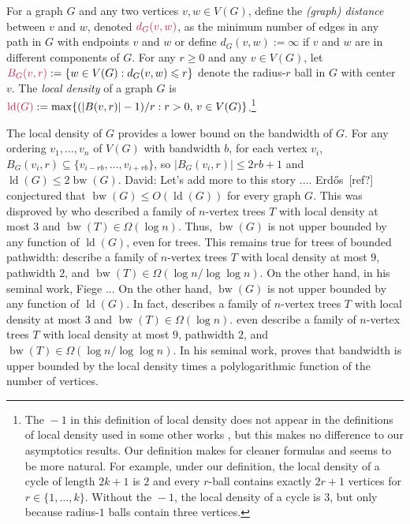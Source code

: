 \documentclass{patmorin}
\makeatletter
\renewcommand{\ge}{\geqslant}
\renewcommand{\le}{\leqslant}
\renewcommand{\leq}{\leqslant}
\newcommand{\david}[1]{{\color{orange} David: #1}}
\newcommand{\defin}[1]{\emph{\textcolor{brightmaroon}{#1}}}
\def\mathcolor#1#{\@mathcolor{#1}}
\def\@mathcolor#1#2#3{%
  \protect\leavevmode
  \begingroup
    \color#1{#2}#3%
  \endgroup
}
\newcommand{\mathdefin}[1]{\mathcolor{brightmaroon}{#1}}
\DeclareMathOperator{\bw}{bw}
\DeclareMathOperator{\ld}{ld}
\makeatother
\begin{document}
For a graph $G$ and any two vertices $v,w\in V(G)$, define the \defin{(graph) distance} between $v$ and $w$, denoted $\mathdefin{d_G(v,w)}$, as the minimum number of edges in any path in $G$ with endpoints $v$ and $w$ or define $d_G(v,w):=\infty$ if $v$ and $w$ are in different components of $G$.  For any $r\ge 0$ and any $v\in V(G)$, let $\mathdefin{B_G(v,r)}:=\{w\in V(G):d_G(v,w)\le r\}$ denote the radius-$r$ ball in $G$ with center $v$.
The \defin{local density} of a graph $G$ is $\mathdefin{\ld(G)}:=\max\{(|B(v,r)|-1)/r:r> 0,\, v\in V(G)\}$.\footnote{The ${}-1$ in this definition of local density does not appear in the definitions of local density used in some other works \cite{feige:approximating,rao:small}, but this makes no difference to our asymptotics results.  Our definition makes for cleaner formulas and seems to be more natural. For example, under our definition, the local density of a cycle of length $2k+1$ is $2$ and every $r$-ball contains exactly $2r+1$ vertices for $r\in\{1,\ldots,k\}$. Without the ${}-1$, the local density of a cycle is $3$, but only because radius-$1$ balls contain three vertices.}



The local density of $G$ provides a lower bound on the bandwidth of $G$. For any ordering $v_1,\dots,v_n$ of $V(G)$ with bandwidth $b$, for each vertex $v_i$, $B_G(v_i,r) \subseteq \{v_{i-rb},\dots,v_{i+rb}\}$, so $|B_G(v_i,r)|\leq 2rb+1$ and $\ld(G)\leq 2\bw(G)$. \david{Let's add more to this story .... Erd\H{o}s~[ref?] conjectured that $\bw(G)\leq O(\ld(G))$ for every graph $G$. This was disproved by \citet{chvatalova:on} who described a family of $n$-vertex trees $T$ with local density at most $3$ and $\bw(T)\in\Omega(\log n)$. Thus, $\bw(G)$ is not upper bounded by any function of $\ld(G)$, even for trees. This remains true for trees of bounded pathwidth: \citet{CS89} describe a family of $n$-vertex trees $T$ with local density at most $9$, pathwidth $2$, and  $\bw(T)\in\Omega(\log n/\log\log n)$. On the other hand, in his seminal work, Fiege ...}
On the other hand, $\bw(G)$ is not upper bounded by any function of $\ld(G)$. In fact, \citet{chvatalova:on} describes a family of $n$-vertex trees $T$ with local density at most $3$ and $\bw(T)\in\Omega(\log n)$.  \citet{CS89} even describe a family of $n$-vertex trees $T$ with local density at most $9$, pathwidth $2$, and  $\bw(T)\in\Omega(\log n/\log\log n)$.  In his seminal work, \citet{feige:approximating} proves that bandwidth is upper bounded by the local density times a polylogarithmic function of the number of vertices.
\end{document}
